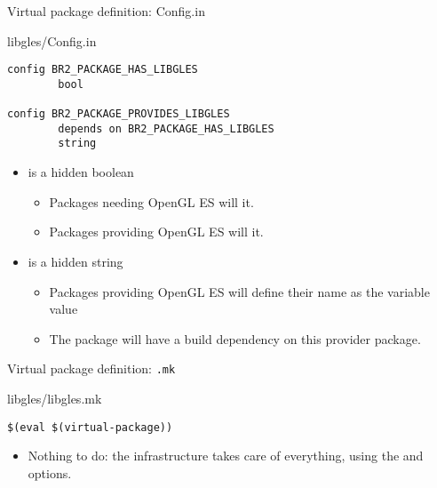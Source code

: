 \begin{frame}[fragile]{Virtual package definition: Config.in}

\begin{block}{libgles/Config.in}
{\small
\begin{verbatim}
config BR2_PACKAGE_HAS_LIBGLES
        bool

config BR2_PACKAGE_PROVIDES_LIBGLES
        depends on BR2_PACKAGE_HAS_LIBGLES
        string
\end{verbatim}}
\end{block}

\begin{itemize}
\item {} is a hidden boolean
  \begin{itemize}
  \item Packages needing OpenGL ES will  it.
  \item Packages providing OpenGL ES will  it.
  \end{itemize}
\item {} is a hidden string
  \begin{itemize}
  \item Packages providing OpenGL ES will define their name as the
    variable value
  \item The  package will have a build dependency on
    this provider package.
  \end{itemize}
\end{itemize}

\end{frame}

\begin{frame}[fragile]{Virtual package definition: {\tt .mk}}

\begin{block}{libgles/libgles.mk}
\begin{verbatim}
$(eval $(virtual-package))
\end{verbatim}
\end{block}

\begin{itemize}

\item Nothing to do: the  infrastructure takes
  care of everything, using the  and
   options.

\end{itemize}

\end{frame}

